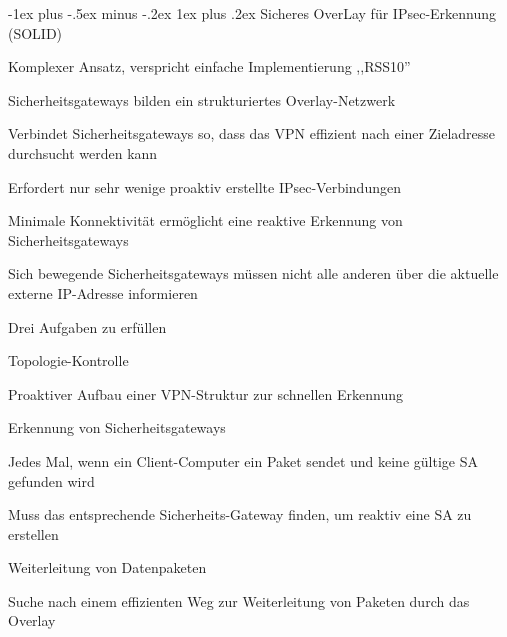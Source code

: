 \documentclass[a4paper]{article}
\makeatletter
\renewcommand{\subsubsection}{\@startsection{subsubsection}{3}{0mm}%
 {-1ex plus -.5ex minus -.2ex}%
 {1ex plus .2ex}%
 {\normalfont\small\bfseries}}
\makeatother
\begin{document}
\begin{multicols}{3}
      \subsubsection{Sicheres OverLay für IPsec-Erkennung (SOLID)}
      \begin{itemize*}
            \item Komplexer Ansatz, verspricht einfache Implementierung ,,RSS10''
            \item Sicherheitsgateways bilden ein strukturiertes Overlay-Netzwerk
            \begin{itemize*}
                  \item Verbindet Sicherheitsgateways so, dass das VPN effizient nach einer Zieladresse durchsucht werden kann
            \end{itemize*}
            \item Erfordert nur sehr wenige proaktiv erstellte IPsec-Verbindungen
            \begin{itemize*}
                  \item Minimale Konnektivität ermöglicht eine reaktive Erkennung von Sicherheitsgateways
                  \item Sich bewegende Sicherheitsgateways müssen nicht alle anderen über die aktuelle externe IP-Adresse informieren
            \end{itemize*}
            \item Drei Aufgaben zu erfüllen
            \begin{itemize*}
                  \item Topologie-Kontrolle
                  \begin{itemize*}
                        \item Proaktiver Aufbau einer VPN-Struktur zur schnellen Erkennung
                  \end{itemize*}
                  \item Erkennung von Sicherheitsgateways
                  \begin{itemize*}
                        \item Jedes Mal, wenn ein Client-Computer ein Paket sendet und keine gültige SA gefunden wird
                        \item Muss das entsprechende Sicherheits-Gateway finden, um reaktiv eine SA zu erstellen
                  \end{itemize*}
                  \item Weiterleitung von Datenpaketen
                  \begin{itemize*}
                        \item Suche nach einem effizienten Weg zur Weiterleitung von Paketen durch das Overlay
                  \end{itemize*}
            \end{itemize*}
      \end{itemize*}


\end{multicols}
\end{document}
